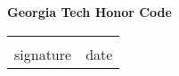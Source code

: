 \documentclass[12pt]{exam}
\begin{document}
    \vspace{6pt}
    \textbf{Georgia Tech Honor Code}\\
    \GTHonorCode
    
    \begin{center}
    \begin{center}
        \def\arraystretch{0.35}%
        \begin{tabular}{ b{8cm} b{8cm} }
        \vspace{.5cm} \underline{\hspace{7cm}} & \vspace{.5cm} \underline{\hspace{4.5cm}}  \tabularnewline
        \vspace{6pt} signature & \vspace{6pt} date    
        \end{tabular}
    \end{center}
    \end{center}    
\end{document}
